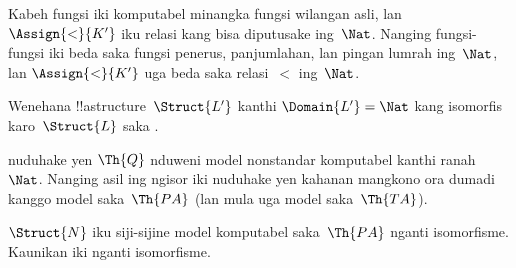 \documentclass[../../../include/open-logic-section]{subfiles}
\begin{document}
\begin{ex}
Kabeh fungsi iki
komputabel minangka
fungsi wilangan asli,
lan $\Assign{<}{K'}$
iku relasi kang
bisa diputusake
ing~$\Nat$.
Nanging fungsi-fungsi iki
beda saka fungsi
penerus, panjumlahan,
lan pingan lumrah
ing~$\Nat$,
lan $\Assign{<}{K'}$
uga beda saka
relasi~$<$
ing~$\Nat$.
\end{ex}

\begin{prob}
Wenehana !!a{structure}~$\Struct{L'}$
kanthi $\Domain{L'} = \Nat$
kang isomorfis
karo~$\Struct{L}$
saka
.
\end{prob}

\begin{explain}
nuduhake yen $\Th{Q}$
nduweni model nonstandar
komputabel kanthi
ranah~$\Nat$.
Nanging asil ing ngisor
iki nuduhake yen
kahanan mangkono
ora dumadi kanggo
model saka~$\Th{PA}$
(lan mula uga
model saka~$\Th{TA}$).
\end{explain}

\begin{thm}
$\Struct{N}$
iku siji-sijine model
komputabel saka~$\Th{PA}$
nganti isomorfisme.
Kaunikan iki nganti isomorfisme.
\end{thm}
  
\end{document}
